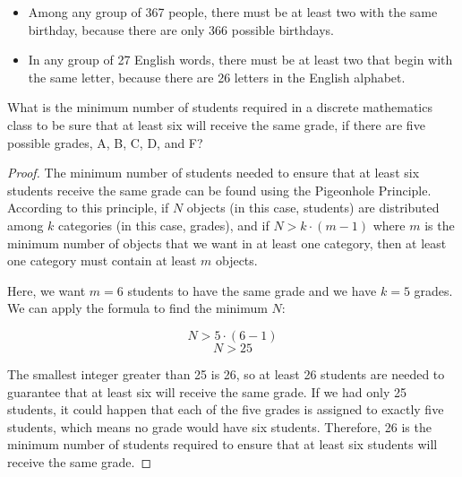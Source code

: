         \begin{example}
            \begin{itemize}
                \item Among any group of 367 people, there must be at least two with the same birthday, because
                there are only 366 possible birthdays.
                \item In any group of 27 English words, there must be at least two that begin with the same letter,
                because there are 26 letters in the English alphabet.
            \end{itemize}
        \end{example}

        \begin{example}
            What is the minimum number of students required in a discrete mathematics class to be sure that at least six will receive the same grade, if there are five possible grades, A, B, C, D, and F?
            \end{example}
            
            \begin{proof}
            The minimum number of students needed to ensure that at least six students receive the same grade can be found using the Pigeonhole Principle. According to this principle, if \(N\) objects (in this case, students) are distributed among \(k\) categories (in this case, grades), and if \(N > k \cdot (m-1)\) where \(m\) is the minimum number of objects that we want in at least one category, then at least one category must contain at least \(m\) objects.
            
            Here, we want \(m = 6\) students to have the same grade and we have \(k = 5\) grades. We can apply the formula to find the minimum \(N\):
            
            \[ N > 5 \cdot (6-1) \]
            \[ N > 25 \]
            
            The smallest integer greater than 25 is 26, so at least 26 students are needed to guarantee that at least six will receive the same grade. If we had only 25 students, it could happen that each of the five grades is assigned to exactly five students, which means no grade would have six students. Therefore, 26 is the minimum number of students required to ensure that at least six students will receive the same grade.
            \end{proof}


